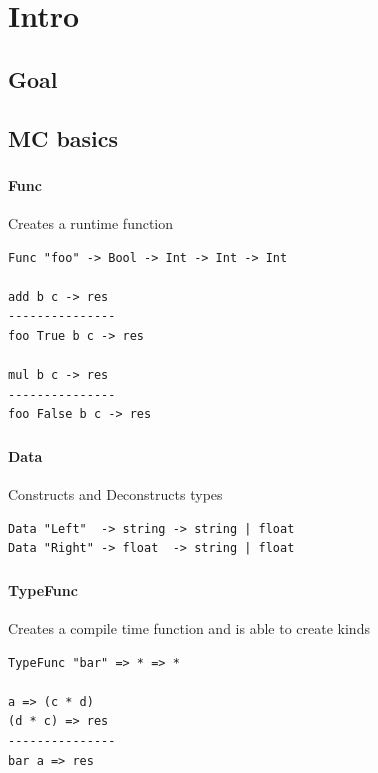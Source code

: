 \section{Intro}
\subsection{Goal}

\subsection{MC basics}

\begin{frame}[fragile]
   \frametitle{\subsecname}
   \framesubtitle{Func}

   Creates a runtime function
   \begin{lstlisting}
Func "foo" -> Bool -> Int -> Int -> Int

add b c -> res
---------------
foo True b c -> res

mul b c -> res
---------------
foo False b c -> res
   \end{lstlisting}
\end{frame}

\begin{frame}[fragile]
   \frametitle{\subsecname}
   \framesubtitle{Data}

   Constructs and Deconstructs types
   \begin{lstlisting}
Data "Left"  -> string -> string | float
Data "Right" -> float  -> string | float
   \end{lstlisting}
\end{frame}

\begin{frame}[fragile]
   \frametitle{\subsecname}
   \framesubtitle{TypeFunc}

   Creates a compile time function and is able to create kinds
   \begin{lstlisting}
TypeFunc "bar" => * => *

a => (c * d)
(d * c) => res
---------------
bar a => res
   \end{lstlisting}
\end{frame}

